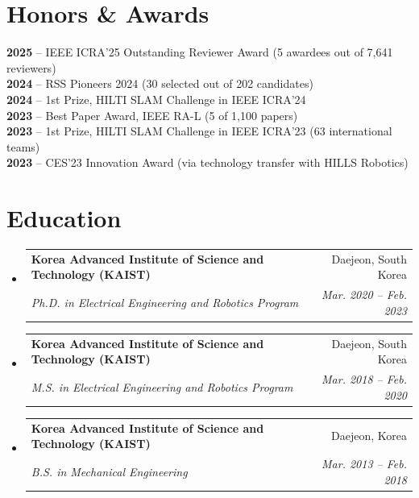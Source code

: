\documentclass[letterpaper,10pt]{article}
\makeatletter
\newcommand{\resumeSubheading}[4]{
  \vspace{-3pt}\item
    \begin{tabular*}{0.97\textwidth}[t]{l@{\extracolsep{\fill}}r}
      \textbf{#1} & #2 \\
      \textit{\small#3} & \textit{\small #4} \\
    \end{tabular*}\vspace{-9pt}
}
\newcommand{\resumeSubHeadingListStart}{\begin{itemize}[leftmargin=0.15in, label={}]}
\newcommand{\resumeSubHeadingListEnd}{\end{itemize}}
\makeatother
\begin{document}
\section{Honors \& Awards}
 \begin{itemize}[leftmargin=0.15in, label={}]
    \small{\item{
     \textbf{2025} -- IEEE ICRA'25 Outstanding Reviewer Award (5 awardees out of 7,641 reviewers) \\
     \textbf{2024} -- RSS Pioneers 2024 (30 selected out of 202 candidates) \\
     \textbf{2024} -- 1st Prize, HILTI SLAM Challenge in IEEE ICRA'24 \\
     \textbf{2023} -- Best Paper Award, IEEE RA-L (5 of 1,100 papers) \\
     \textbf{2023} -- 1st Prize, HILTI SLAM Challenge in IEEE ICRA'23 (63 international teams) \\
     \textbf{2023} -- CES'23 Innovation Award (via technology transfer with HILLS Robotics)
    }}
 \end{itemize}


\section{Education}
  \resumeSubHeadingListStart
    \resumeSubheading
      {Korea Advanced Institute of Science and Technology (KAIST)}{Daejeon, South Korea}
      {Ph.D. in Electrical Engineering and Robotics Program}{Mar. 2020 -- Feb. 2023}
    \resumeSubheading
      {Korea Advanced Institute of Science and Technology (KAIST)}{Daejeon, South Korea}
      {M.S. in Electrical Engineering and Robotics Program}{Mar. 2018 -- Feb. 2020}
    \resumeSubheading
      {Korea Advanced Institute of Science and Technology (KAIST)}{Daejeon, Korea}
      {B.S. in Mechanical Engineering}{Mar. 2013 -- Feb. 2018}

  \resumeSubHeadingListEnd


\end{document}
